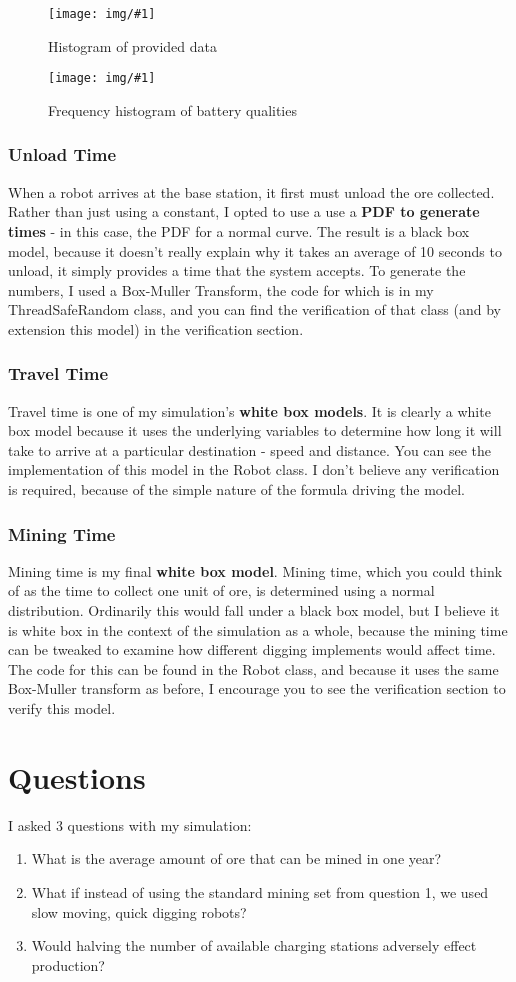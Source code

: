 \documentclass{article}
\makeatletter
\def\maxwidth#1{\ifdim\Gin@nat@width>#1 #1\else\Gin@nat@width\fi}
\newcommand{\img}[2]{
	\begin{figure}[ht!]
		\texttt{[image: img/\#1]}
		\centering
		\caption{#2}
	\end{figure}
}
\makeatother
\begin{document}
\img{batteryQualityHistogram.png}{Histogram of provided data}
\img{batteryQualtiyFrequencyData.png}{Frequency histogram of battery qualities}

\subsubsection{Unload Time}
When a robot arrives at the base station, it first must unload the ore collected.
Rather than just using a constant, I opted to use a use a \textbf{PDF to generate times} - in this case, the PDF for a normal curve.
The result is a black box model, because it doesn't really explain why it takes an average of 10 seconds to unload, it simply provides a time that the system accepts.
To generate the numbers, I used a Box-Muller Transform, the code for which is in my ThreadSafeRandom class, and you can find the verification of that class (and by extension this model) in the verification section.

\subsubsection{Travel Time}
Travel time is one of my simulation's \textbf{white box models}. 
It is clearly a white box model because it uses the underlying variables to determine how long it will take to arrive at a particular destination - speed and distance.
You can see the implementation of this model in the Robot class. I don't believe any verification is required, because of the simple nature of the formula driving the model.

\subsubsection{Mining Time}
Mining time is my final \textbf{white box model}.
Mining time, which you could think of as the time to collect one unit of ore, is determined using a normal distribution.
Ordinarily this would fall under a black box model, but I believe it is white box in the context of the simulation as a whole, because the mining time can be tweaked to examine how different digging implements would affect time. The code for this can be found in the Robot class, and because it uses the same Box-Muller transform as before, I encourage you to see the verification section to verify this model.
\clearpage

\section{Questions}
I asked 3 questions with my simulation:
\begin{enumerate}
\item What is the average amount of ore that can be mined in one year?
\item What if instead of using the standard mining set from question 1, we used slow moving, quick digging robots?
\item Would halving the number of available charging stations adversely effect production?
\end{enumerate}
\end{document}
